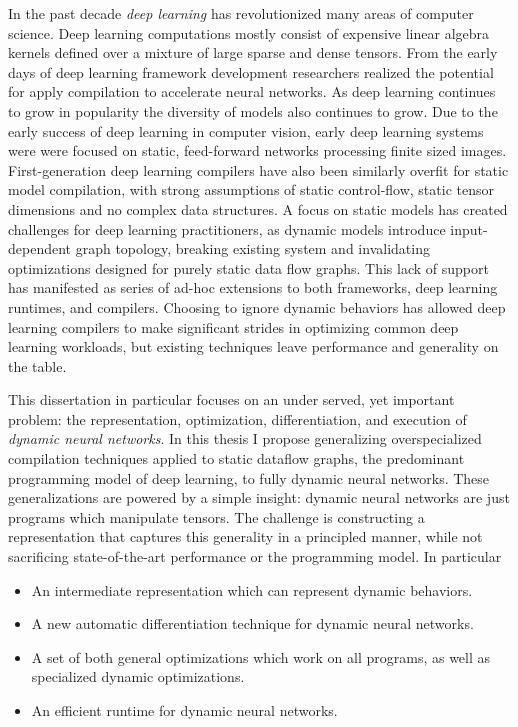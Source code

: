 \begin{fullwidth}
\begin{center}

In the past decade \emph{deep learning} has revolutionized many areas of
    computer science.
Deep learning computations mostly consist
    of expensive linear algebra kernels defined over a mixture
    of large sparse and dense tensors.
From the early days of deep learning framework development researchers realized the
    potential for apply compilation to accelerate neural networks.
As deep learning continues to grow in popularity the diversity
    of models also continues to grow.
Due to the early success of deep learning in computer
    vision, early deep learning systems were were focused on static,
    feed-forward networks processing finite sized images.
First-generation deep learning compilers have also been similarly overfit
    for static model compilation, with strong assumptions of static control-flow,
    static tensor dimensions and no complex data structures.
A focus on static models has created challenges for deep learning practitioners,
    as dynamic models introduce input-dependent graph topology,
    breaking existing system and invalidating optimizations
    designed for purely static data flow graphs.
This lack of support has manifested as series of ad-hoc extensions to
  both frameworks, deep learning runtimes, and compilers.
Choosing to ignore dynamic behaviors has allowed deep learning
    compilers to make significant strides in optimizing common
    deep learning workloads, but existing techniques leave performance
    and generality on the table.

This dissertation in particular focuses on an under served, yet important problem:
  the representation,
  optimization,
  differentiation,
  and execution of \emph{dynamic neural networks}.
In this thesis I propose generalizing overspecialized
  compilation techniques applied to static dataflow graphs,
  the predominant programming model of deep learning,
  to fully dynamic neural networks.
These generalizations are powered by a simple insight:
  dynamic neural networks are just programs which manipulate tensors.
The challenge is constructing a representation that captures this generality
  in a principled manner, while not sacrificing state-of-the-art performance or the programming model.
In particular
\begin{itemize}
    \item An intermediate representation which can represent dynamic behaviors.
    \item A new automatic differentiation technique for dynamic neural networks.
    \item A set of both general optimizations which work on all programs, as well
          as specialized dynamic optimizations.
    \item An efficient runtime for dynamic neural networks.
\end{itemize}


\end{center}
\end{fullwidth}
